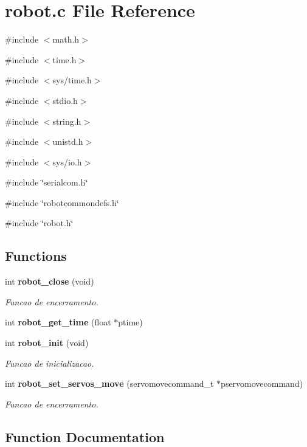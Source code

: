 \section{robot.c File Reference}
\label{robot_8c}
{\ttfamily \#include $<$math.h$>$}\par
{\ttfamily \#include $<$time.h$>$}\par
{\ttfamily \#include $<$sys/time.h$>$}\par
{\ttfamily \#include $<$stdio.h$>$}\par
{\ttfamily \#include $<$string.h$>$}\par
{\ttfamily \#include $<$unistd.h$>$}\par
{\ttfamily \#include $<$sys/io.h$>$}\par
{\ttfamily \#include \char`\"{}serialcom.h\char`\"{}}\par
{\ttfamily \#include \char`\"{}robotcommondefs.h\char`\"{}}\par
{\ttfamily \#include \char`\"{}robot.h\char`\"{}}\par
\subsection*{Functions}
\begin{DoxyCompactItemize}
\item 
int {\bf robot\_\-close} (void)
\begin{DoxyCompactList}\small\item\em Funcao de encerramento. \item\end{DoxyCompactList}\item 
int {\bf robot\_\-get\_\-time} (float $\ast$ptime)
\item 
int {\bf robot\_\-init} (void)
\begin{DoxyCompactList}\small\item\em Funcao de inicializacao. \item\end{DoxyCompactList}\item 
int {\bf robot\_\-set\_\-servos\_\-move} (servomovecommand\_\-t $\ast$pservomovecommand)
\begin{DoxyCompactList}\small\item\em Funcao de encerramento. \item\end{DoxyCompactList}\end{DoxyCompactItemize}


\subsection{Function Documentation}
